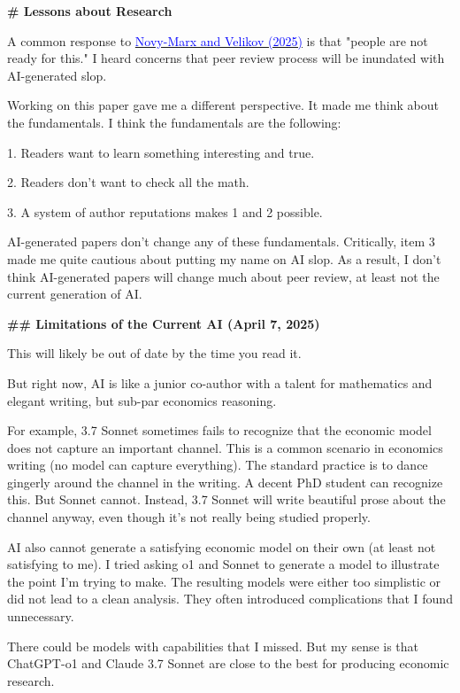 \begin{mdframed}[linewidth=1pt, linecolor=black]
\textbf{\textcolor{red!70!black}{\# Lessons about Research }}

A common response to \href{https://www.nber.org/papers/w33363}{\textcolor{blue}{Novy-Marx and Velikov (2025)}} is that "people are not ready for this." I heard concerns that peer review process will be inundated with AI-generated slop.

Working on this paper gave me a different perspective. It made me think about the fundamentals. I think the fundamentals are the following:

1. Readers want to learn something interesting and true.

2. Readers don't want to check all the math.

3. A system of author reputations makes 1 and 2 possible.

AI-generated papers don't change any of these fundamentals.  Critically, item 3 made me quite cautious about putting my name on AI slop. As a result, I don't think AI-generated papers will change much about peer review, at least not the current generation of AI.

\textbf{\textcolor{red!70!black}{\#\# Limitations of the Current AI (April 7, 2025)}}

This will likely be out of date by the time you read it.

But right now, AI is like a junior co-author with a talent for mathematics and elegant writing, but sub-par economics reasoning. 

For example, 3.7 Sonnet sometimes fails to recognize that the economic model does not capture an important channel. This is a common scenario in economics writing (no model can capture everything). The standard practice is to dance gingerly around the channel in the writing. A decent PhD student can recognize this. But Sonnet cannot. Instead, 3.7 Sonnet will write beautiful prose about the channel anyway, even though it's not really being studied properly. 

AI also cannot generate a satisfying economic model on their own (at least not satisfying to me). I tried asking o1 and Sonnet to generate a model to illustrate the point I'm trying to make. The resulting models were either too simplistic or did not lead to a clean analysis. They often introduced complications that I found unnecessary. 

There could be models with capabilities that I missed. But my sense is that ChatGPT-o1 and Claude 3.7 Sonnet are close to the best for producing economic research.


\end{mdframed}
